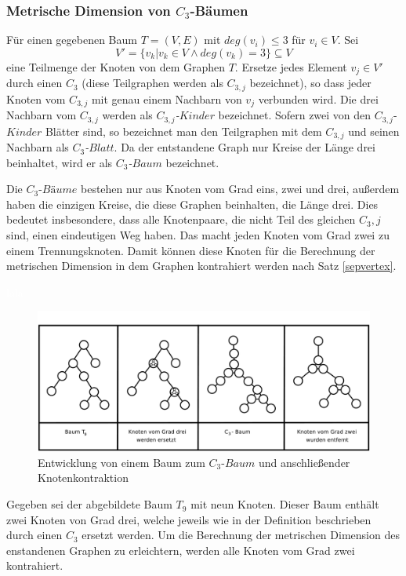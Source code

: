 \subsubsection{Metrische Dimension von $C_3$-Bäumen}
\begin{defi}
\label{C_{3} tree}
Für einen gegebenen Baum $T=(V,E)$ mit $deg(v_i)\leq 3$ für $v_i \in V$. Sei $$V'=\{v_k|v_k \in V \wedge deg(v_k)=3\}\subseteq V$$ eine Teilmenge der Knoten von dem Graphen $T$. Ersetze jedes Element $v_j \in V'$ durch einen $C_3$ (diese Teilgraphen werden als \emph{$C_{3,j}$} bezeichnet), so dass jeder Knoten vom $C_{3,j}$ mit genau einem Nachbarn von $v_j$ verbunden wird. Die drei Nachbarn vom $C_{3,j}$ werden als \emph{$C_{3,j}$-$Kinder$} bezeichnet. Sofern zwei von den $C_{3,j}$-$Kinder$ Blätter sind, so bezeichnet man den Teilgraphen mit dem $C_{3,j}$ und seinen Nachbarn als \emph{$C_{3}$-$Blatt$}. Da der entstandene Graph nur Kreise der Länge drei beinhaltet, wird er als \emph{$C_3$-$Baum$} bezeichnet. 
   \end{defi}
Die $C_3$-$Bäume$ bestehen nur aus Knoten vom Grad eins, zwei und drei, außerdem haben die einzigen Kreise, die diese Graphen beinhalten, die Länge drei. Dies bedeutet insbesondere, dass alle Knotenpaare, die nicht Teil des gleichen $C_3,j$ sind, einen eindeutigen Weg haben. Das macht jeden Knoten vom Grad zwei zu einem Trennungsknoten. Damit können diese Knoten für die Berechnung der metrischen Dimension in dem Graphen kontrahiert werden nach Satz \ref{sepvertex}.
\begin{bsp} \textcolor{white}{lala} \vspace{-6mm}
\begin{figure}[h!]
		\centering 		 
   \includegraphics[width=420pt]{bilder/trees.pdf}
	\caption{Entwicklung von einem Baum zum $C_{3}$-$Baum$ und anschließender Knotenkontraktion}
  	 \end{figure}
\end{bsp}
Gegeben sei der abgebildete Baum $T_9$ mit neun Knoten. Dieser Baum enthält zwei Knoten von Grad drei, welche jeweils wie in der Definition beschrieben durch einen $C_3$ ersetzt werden. Um die Berechnung der metrischen Dimension des enstandenen Graphen zu erleichtern, werden alle Knoten vom Grad zwei kontrahiert.
